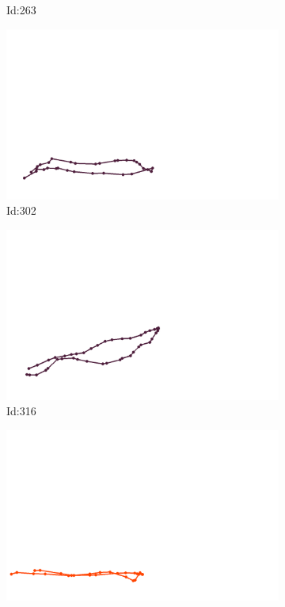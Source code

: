 \documentclass[12pt,twoside]{report}
\begin{document}
\begin{figure}
\begin{subfigure}[b]{0.20\textwidth}
\caption{Id:263}
\end{subfigure}
\begin{subfigure}[b]{0.20\textwidth}
\centering
\includegraphics[width=\textwidth]{../trajectories/302.png}
\caption{Id:302}
\end{subfigure}
\begin{subfigure}[b]{0.20\textwidth}
\centering
\includegraphics[width=\textwidth]{../trajectories/316.png}
\caption{Id:316}
\end{subfigure}
\begin{subfigure}[b]{0.20\textwidth}
\centering
\includegraphics[width=\textwidth]{../trajectories/377.png}

\end{subfigure}
\end{figure}
\end{document}

